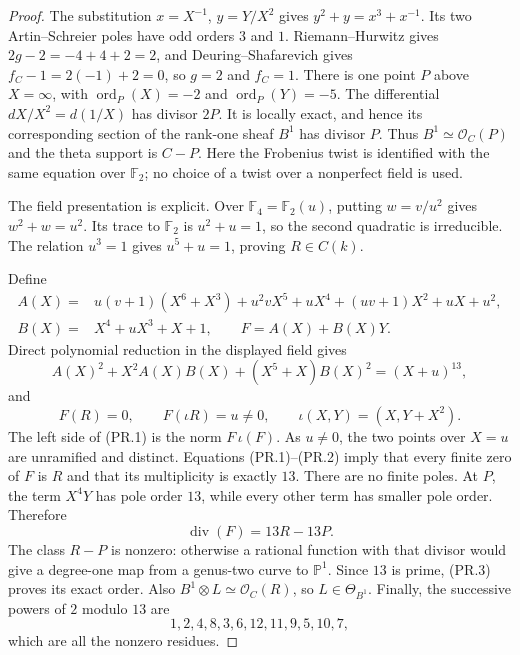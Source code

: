\documentclass[11pt,a4paper]{article}
\begin{document}
\begin{proof}
The substitution $x=X^{-1}$, $y=Y/X^2$ gives
$y^2+y=x^3+x^{-1}$. Its two Artin--Schreier poles have odd orders
$3$ and $1$. Riemann--Hurwitz gives $2g-2=-4+4+2=2$, and
Deuring--Shafarevich gives $f_C-1=2(-1)+2=0$, so $g=2$ and $f_C=1$.
There is one point $P$ above $X=\infty$, with
$\operatorname{ord}_P(X)=-2$ and $\operatorname{ord}_P(Y)=-5$.
The differential $dX/X^2=d(1/X)$ has divisor $2P$.
It is locally exact, and hence its corresponding section of the
rank-one sheaf $B^1$ has divisor $P$. Thus
$B^1\simeq\mathcal O_C(P)$ and the theta support is $C-P$.
Here the Frobenius twist is identified with the same equation over
$\mathbb F_2$; no choice of a twist over a nonperfect field is used.

The field presentation is explicit. Over $\mathbb F_4=\mathbb F_2(u)$,
putting $w=v/u^2$ gives $w^2+w=u^2$. Its trace to $\mathbb F_2$ is
$u^2+u=1$, so the second quadratic is irreducible. The relation
$u^3=1$ gives $u^5+u=1$, proving $R\in C(k)$.

Define
\begin{align*}
 A(X)={}&u(v+1)(X^6+X^3)+u^2vX^5+uX^4
                 +(uv+1)X^2+uX+u^2,\\
 B(X)={}&X^4+uX^3+X+1,\qquad F=A(X)+B(X)Y.
\end{align*}
Direct polynomial reduction in the displayed field gives
\[
 A(X)^2+X^2A(X)B(X)+(X^5+X)B(X)^2=(X+u)^{13},
 \tag{PR.1}
\]
and
\[
 F(R)=0,\qquad F(\iota R)=u\ne0,
 \qquad\iota(X,Y)=(X,Y+X^2).
 \tag{PR.2}
\]
The left side of (PR.1) is the norm $F\,\iota(F)$.
As $u\ne0$, the two points over $X=u$ are unramified and distinct.
Equations (PR.1)--(PR.2) imply that every finite zero of $F$ is $R$
and that its multiplicity is exactly $13$. There are no finite poles.
At $P$, the term $X^4Y$ has pole order $13$, while every other term
has smaller pole order. Therefore
\[
 \operatorname{div}(F)=13R-13P.\tag{PR.3}
\]
The class $R-P$ is nonzero: otherwise a rational function with that
divisor would give a degree-one map from a genus-two curve to
$\mathbb P^1$. Since $13$ is prime, (PR.3) proves its exact order.
Also $B^1\otimes L\simeq\mathcal O_C(R)$, so $L\in\Theta_{B^1}$.
Finally, the successive powers of $2$ modulo $13$ are
\[
 1,2,4,8,3,6,12,11,9,5,10,7,
\]
which are all the nonzero residues.
\end{proof}
\end{document}
